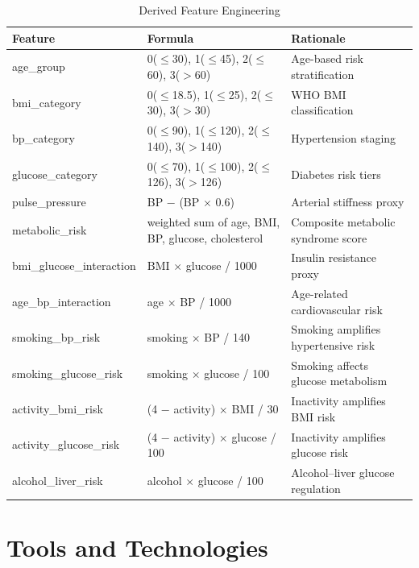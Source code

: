 \documentclass[12pt,a4paper]{report}
\begin{document}
\begin{table}[H]
\centering
\caption{Derived Feature Engineering}
\label{tab:eng_features}
\begin{tabularx}{\textwidth}{lXX}
\toprule
\textbf{Feature} & \textbf{Formula} & \textbf{Rationale} \\
\midrule
age\_group & 0($\le$30), 1($\le$45), 2($\le$60), 3($>$60) & Age-based risk stratification \\
bmi\_category & 0($\le$18.5), 1($\le$25), 2($\le$30), 3($>$30) & WHO BMI classification \\
bp\_category & 0($\le$90), 1($\le$120), 2($\le$140), 3($>$140) & Hypertension staging \\
glucose\_category & 0($\le$70), 1($\le$100), 2($\le$126), 3($>$126) & Diabetes risk tiers \\
pulse\_pressure & BP $-$ (BP $\times$ 0.6) & Arterial stiffness proxy \\
metabolic\_risk & weighted sum of age, BMI, BP, glucose, cholesterol & Composite metabolic syndrome score \\
bmi\_glucose\_interaction & BMI $\times$ glucose / 1000 & Insulin resistance proxy \\
age\_bp\_interaction & age $\times$ BP / 1000 & Age-related cardiovascular risk \\
smoking\_bp\_risk & smoking $\times$ BP / 140 & Smoking amplifies hypertensive risk \\
smoking\_glucose\_risk & smoking $\times$ glucose / 100 & Smoking affects glucose metabolism \\
activity\_bmi\_risk & (4 $-$ activity) $\times$ BMI / 30 & Inactivity amplifies BMI risk \\
activity\_glucose\_risk & (4 $-$ activity) $\times$ glucose / 100 & Inactivity amplifies glucose risk \\
alcohol\_liver\_risk & alcohol $\times$ glucose / 100 & Alcohol--liver glucose regulation \\
\bottomrule
\end{tabularx}
\end{table}

\section{Tools and Technologies}
\end{document}
